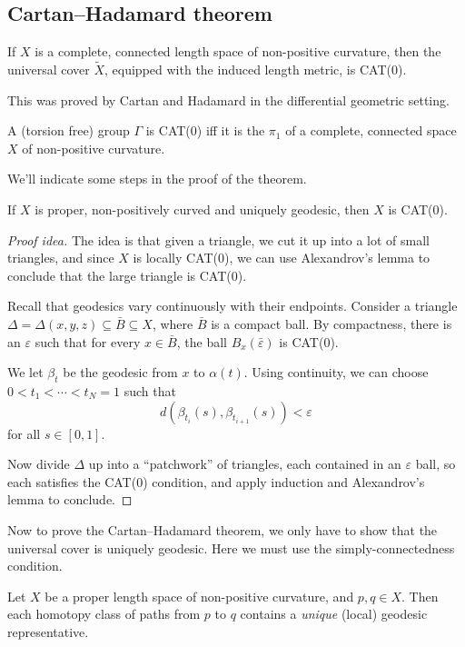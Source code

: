 \documentclass[a4paper]{article}
\begin{document}
\subsection{Cartan--Hadamard theorem}

\begin{thm}
  If $X$ is a complete, connected length space of non-positive curvature, then the universal cover $\tilde{X}$, equipped with the induced length metric, is CAT(0).
\end{thm}
This was proved by Cartan and Hadamard in the differential geometric setting.

\begin{cor}
  A (torsion free) group $\Gamma$ is CAT(0) iff it is the $\pi_1$ of a complete, connected space $X$ of non-positive curvature.
\end{cor}

We'll indicate some steps in the proof of the theorem.
\begin{lemma}
  If $X$ is proper, non-positively curved and uniquely geodesic, then $X$ is CAT(0).
\end{lemma}

\begin{proof}[Proof idea]
  The idea is that given a triangle, we cut it up into a lot of small triangles, and since $X$ is locally CAT(0), we can use Alexandrov's lemma to conclude that the large triangle is CAT(0).

  Recall that geodesics vary continuously with their endpoints. Consider a triangle $\Delta = \Delta (x, y, z) \subseteq \bar{B} \subseteq X$, where $\bar{B}$ is a compact ball. By compactness, there is an $\varepsilon$ such that for every $x \in \bar{B}$, the ball $B_x(\bar{\varepsilon})$ is CAT(0).

  We let $\beta_t$ be the geodesic from $x$ to $\alpha(t)$. Using continuity, we can choose $0 < t_1 < \cdots < t_N = 1$ such that
  \[
    d(\beta_{t_i}(s), \beta_{t_{i + 1}}(s)) < \varepsilon
  \]
  for all $s \in [0, 1]$.

  Now divide $\Delta$ up into a ``patchwork'' of triangles, each contained in an $\varepsilon$ ball, so each satisfies the CAT(0) condition, and apply induction and Alexandrov's lemma to conclude.
\end{proof}

Now to prove the Cartan--Hadamard theorem, we only have to show that the universal cover is uniquely geodesic. Here we must use the simply-connectedness condition.
\begin{thm}
  Let $X$ be a proper length space of non-positive curvature, and $p, q \in X$. Then each homotopy class of paths from $p$ to $q$ contains a \emph{unique} (local) geodesic representative.
\end{thm}

\printindex
\end{document}
